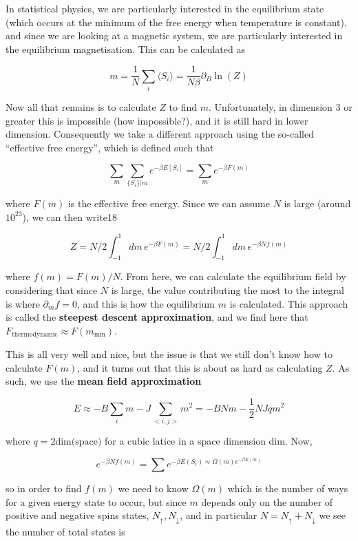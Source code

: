 \documentclass{article}
\theoremstyle{definition}
\begin{document}
In statistical physics, we are particularly interested in the equilibrium state
(which occurs at the minimum of the free energy when temperature is constant),
and since we are looking at a magnetic system, we are particularly interested in
the equilibrium magnetisation. This can be calculated as

$$ m = \frac{1}{N} \sum_i \langle S_i \rangle = \frac{1}{N \beta} \partial_B
\ln(Z) $$

Now all that remains is to calculate $Z$ to find $m$. Unfortunately, in
dimension 3 or greater this is impossible (how impossible?), and it is still
hard in lower dimension. Consequently we take a different approach using the
so-called ``effective free energy'', which is defined such that

$$ \sum_m \sum_{\{S_i\} | m} e^{-\beta E[S_i]} = \sum_m e^{-\beta F(m)} $$

where $F(m)$ is the effective free energy. Since we can assume $N$ is large
(around $10^{23}$), we can then write18

$$ Z = N / 2 \int_{-1}^1 dm \, e^{-\beta F(m)}  = N / 2 \int_{-1}^1 dm \,
e^{-\beta N f(m)}$$

where $f(m) = F(m) / N$. From here, we can calculate the equilibrium field by
considering that since $N$ is large, the value contributing the most to the
integral is where $\partial_m f = 0$, and this is how the equilibrium $m$ is
calculated. This approach is called the \textbf{steepest descent approximation},
and we find here that $F_{\text{thermodynamic}} \approx F(m_{\text{min}})$.

This is all very well and nice, but the issue is that we still don't know how to
calculate $F(m)$, and it turns out that this is about as hard as calculating
$Z$. As such, we use the \textbf{mean field approximation}

$$ E \approx -B \sum_i m - J \sum_{<i, j>} m^2 = -BNm - \frac{1}{2} N J q m^2 $$

where $q = 2 \text{dim(space)}$ for a cubic latice in a space dimension dim.
Now,

$$ e^{-\beta N f(m)} = \sum e^{-\beta E(S_i) \approx \Omega(m) e^{-\beta
    E(m)}} $$

so in order to find $f(m)$ we need to know $\Omega(m)$ which is the number of
ways for a given energy state to occur, but since $m$ depends only on the number
of positive and negative spins states, $N_\uparrow, N_\downarrow$, and in
particular $N = N_\uparrow + N_\downarrow$ we see the number of total states is
\end{document}
